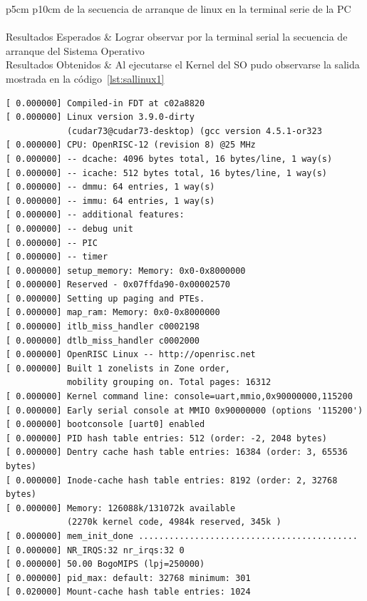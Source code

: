\begin{table}[h!]
\begin{tabular}{ p{5cm} p{10cm}  }
		de la secuencia de arranque de linux en la terminal serie de la PC\\
		\hline	{}\\
		\hline			   Resultados Esperados & Lograr observar por la terminal serial la secuencia de arranque del Sistema Operativo\\
		\hline	 		   Resultados Obtenidos & Al ejecutarse el Kernel del SO pudo observarse la salida mostrada en la código~\ref{lst:sallinux1}\\
		\hline	
		\end{tabular}
		\caption{Caso de prueba T014}
		\label{tab:cp14}
		\end{table}
	
\newpage 
		
\begin{lstlisting}[frame=single,caption={Salida de la secuencia de inicio de linux embebido},label={lst:sallinux1}]
[ 0.000000] Compiled-in FDT at c02a8820 
[ 0.000000] Linux version 3.9.0-dirty 
			(cudar73@cudar73-desktop) (gcc version 4.5.1-or323 
[ 0.000000] CPU: OpenRISC-12 (revision 8) @25 MHz 
[ 0.000000] -- dcache: 4096 bytes total, 16 bytes/line, 1 way(s) 
[ 0.000000] -- icache: 512 bytes total, 16 bytes/line, 1 way(s) 
[ 0.000000] -- dmmu: 64 entries, 1 way(s) 
[ 0.000000] -- immu: 64 entries, 1 way(s) 
[ 0.000000] -- additional features: 
[ 0.000000] -- debug unit 
[ 0.000000] -- PIC 
[ 0.000000] -- timer 
[ 0.000000] setup_memory: Memory: 0x0-0x8000000 
[ 0.000000] Reserved - 0x07ffda90-0x00002570 
[ 0.000000] Setting up paging and PTEs. 
[ 0.000000] map_ram: Memory: 0x0-0x8000000 
[ 0.000000] itlb_miss_handler c0002198 
[ 0.000000] dtlb_miss_handler c0002000 
[ 0.000000] OpenRISC Linux -- http://openrisc.net 
[ 0.000000] Built 1 zonelists in Zone order, 
			mobility grouping on. Total pages: 16312 
[ 0.000000] Kernel command line: console=uart,mmio,0x90000000,115200 
[ 0.000000] Early serial console at MMIO 0x90000000 (options '115200') 
[ 0.000000] bootconsole [uart0] enabled 
[ 0.000000] PID hash table entries: 512 (order: -2, 2048 bytes) 
[ 0.000000] Dentry cache hash table entries: 16384 (order: 3, 65536 bytes) 
[ 0.000000] Inode-cache hash table entries: 8192 (order: 2, 32768 bytes) 
[ 0.000000] Memory: 126088k/131072k available 
			(2270k kernel code, 4984k reserved, 345k ) 
[ 0.000000] mem_init_done ........................................... 
[ 0.000000] NR_IRQS:32 nr_irqs:32 0 
[ 0.000000] 50.00 BogoMIPS (lpj=250000) 
[ 0.000000] pid_max: default: 32768 minimum: 301 
[ 0.020000] Mount-cache hash table entries: 1024 

\end{lstlisting}

